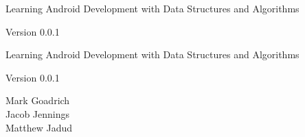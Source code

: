 \documentclass[10pt]{book}
\newcommand{\thetitle}{Learning Android Development with Data Structures and Algorithms}
\newcommand{\theversion}{0.0.1}
\begin{document}
\frontmatter





\begin{latexonly}

\renewcommand{\blankpage}{\thispagestyle{empty} \quad \newpage}



\thispagestyle{empty}

\begin{flushright}
\vspace*{2.5in}

\begin{spacing}{3}
{\huge \thetitle}
\end{spacing}

\vspace{0.25in}

Version \theversion

\vfill

\end{flushright}


\blankpage
\blankpage

\pagebreak
\thispagestyle{empty}

\begin{flushright}
\vspace*{2.5in}

\begin{spacing}{3}
{\huge \thetitle}
\end{spacing}

\vspace{0.25in}

Version \theversion

\vspace{1in}


{\Large
Mark Goadrich\\
Jacob Jennings\\
Matthew Jadud\\
}


\vspace{0.5in}

\vfill

\end{flushright}



\end{latexonly}
\end{document}
